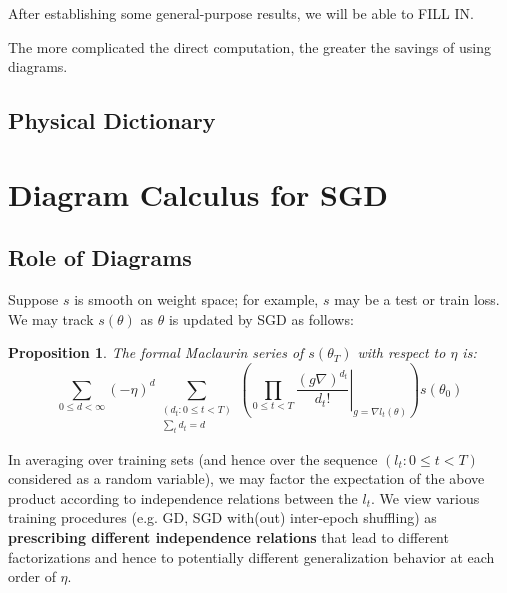 \documentclass{article}
\newtheorem{prop}{Proposition}
\begin{document}
    After establishing some general-purpose results, we will be able to
    {\color{red} FILL IN}. 
    
    The more complicated the direct computation, the greater the savings of
    using diagrams.
        
\subsection*{Physical Dictionary}


\section{Diagram Calculus for SGD}
\subsection*{Role of Diagrams}
    Suppose $s$ is smooth on weight space; for example, $s$ may be a test or
    train loss.  We may track $s(\theta)$ as $\theta$ is updated by SGD as
    follows:
    \begin{prop}
        The formal Maclaurin series of $s(\theta_T)$ with respect to $\eta$ is:
        \begin{equation*}\label{eq:dyson}
            \sum_{0\leq d < \infty} (-\eta)^d \sum_{\substack{(d_t: 0\leq t<T) \\ \sum_t d_t = d}}
            \left(
                \prod_{0 \leq t < T}
                    \left.  \frac{(g \nabla)^{d_t}}{d_t!} \right|_{g=\nabla l_t(\theta)}
            \right)
            s (\theta_0)
        \end{equation*}
    \end{prop}
    In averaging over training sets (and hence over the sequence $(l_t: 0\leq
    t<T)$ considered as a random variable), we may factor the expectation of
    the above product according to independence relations between the $l_t$.
    We view various training procedures (e.g. GD, SGD with(out) inter-epoch
    shuffling) as {\bf prescribing different independence relations} that lead
    to different factorizations and hence to potentially different
    generalization behavior at each order of $\eta$.
\end{document}
